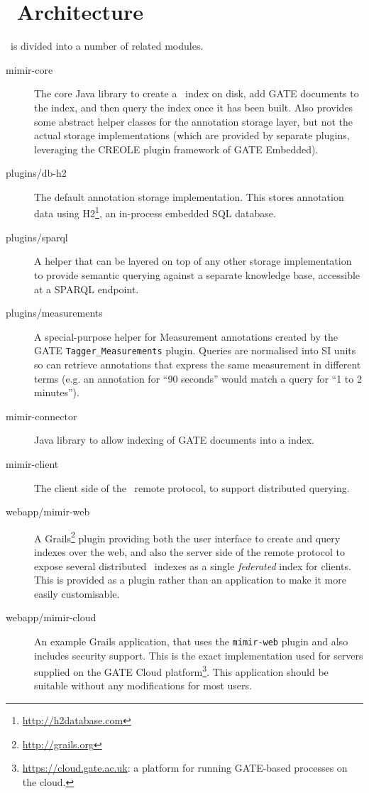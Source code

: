 \section{\Mimir\ Architecture}

\Mimir\ is divided into a number of related modules.

\begin{description}
\item[mimir-core] The core Java library to create a \Mimir\ index on disk, add
GATE documents to the index, and then query the index once it has been built.
Also provides some abstract helper classes for the annotation storage layer,
but not the actual storage implementations (which are provided by separate
plugins, leveraging the CREOLE plugin framework of GATE Embedded).

\item[plugins/db-h2] The default annotation storage implementation.  This
stores annotation data using H2\footnote{\url{http://h2database.com}}, an
in-process embedded SQL database.

\item[plugins/sparql] A helper that can be layered on top of any other storage
implementation to provide semantic querying against a separate knowledge base,
accessible at a SPARQL endpoint.

\item[plugins/measurements] A special-purpose helper for Measurement
annotations created by the GATE {\tt Tagger\_Measurements} plugin.  Queries are
normalised into SI units so can retrieve annotations that express the same
measurement in different terms (e.g. an annotation for ``90 seconds'' would
match a query for ``1 to 2 minutes'').

\item[mimir-connector] Java library to allow indexing of GATE documents into
a \Mimir{} index.

\item[mimir-client] The client side of the \Mimir\ remote protocol, to support
distributed querying.

\item[webapp/mimir-web] A Grails\footnote{\url{http://grails.org}} plugin providing
both the user interface to create and query indexes over the web, and also the
server side of the remote protocol to expose several distributed \Mimir\
indexes as a single {\em federated} index for clients.  This is provided as a
plugin rather than an application to make it more easily customisable.

\item[webapp/mimir-cloud] An example Grails application, that uses the {\tt mimir-web}
plugin and also includes security support. This is the exact implementation used
for \Mimir{} servers supplied on the GATE Cloud
platform\footnote{\url{https://cloud.gate.ac.uk}: a platform for running GATE-based
processes on the cloud.}. This application should be suitable without any
modifications for most users.
\end{description}

